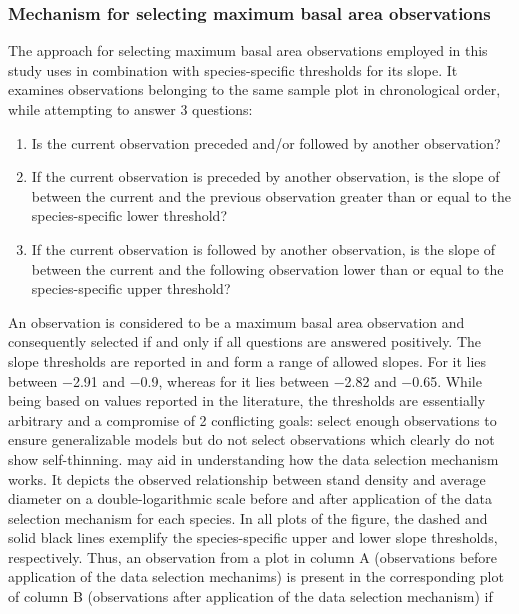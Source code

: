 \subsubsection{Mechanism for selecting maximum basal area observations}

The approach for selecting maximum basal area observations employed in this study uses  in combination with species-specific thresholds for its slope.  It examines observations belonging to the same sample plot in chronological order, while attempting to answer 3 questions:
\begin{enumerate}
\item Is the current observation preceded and/or followed by another observation?
\item If the current observation is preceded by another observation, is the slope of  between the current and the previous observation greater than or equal to the species-specific lower threshold?
\item If the current observation is followed by another observation, is the slope of  between the current and the following observation lower than or equal to the species-specific upper threshold?
\end{enumerate}
An observation is considered to be a maximum basal area observation and consequently selected if and only if all questions are answered positively.  The slope thresholds are reported in  and form a range of allowed slopes.  For \Beech{} it lies between \num{-2.91} and \num{-0.9}, whereas for \Spruce{} it lies between \num{-2.82} and \num{-0.65}.  While being based on values reported in the literature, the thresholds are essentially arbitrary and a compromise of 2 conflicting goals: select enough observations to ensure generalizable models but do not select observations which clearly do not show self-thinning.
 may aid in understanding how the data selection mechanism works.  It depicts the observed relationship between stand density and average diameter on a double-logarithmic scale before and after application of the data selection mechanism for each species.  In all plots of the figure, the dashed and solid black lines exemplify the species-specific upper and lower slope thresholds, respectively.  Thus, an observation from a plot in column A (observations before application of the data selection mechanims) is present in the corresponding plot of column B (observations after application of the data selection mechanism) if
